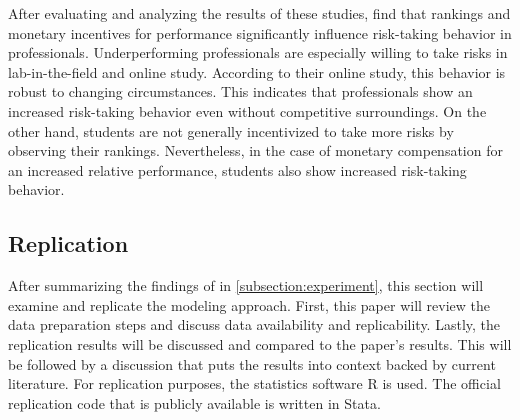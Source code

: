 \documentclass[12pt]{article}
\begin{document}
\par
After evaluating and analyzing the results of these studies, \textcite{Kirchler2018} find that rankings and monetary incentives for performance significantly influence risk-taking behavior in professionals. Underperforming professionals are especially willing to take risks in lab-in-the-field and online study. According to their online study, this behavior is robust to changing circumstances. This indicates that professionals show an increased risk-taking behavior even without competitive surroundings. On the other hand, students are not generally incentivized to take more risks by observing their rankings. Nevertheless, in the case of monetary compensation for an increased relative performance, students also show increased risk-taking behavior.


\subsection{Replication} \label{subsection:replication}
After summarizing the findings of \textcite{Kirchler2018} in \autoref{subsection:experiment}, this section will examine and replicate the modeling approach. First, this paper will review the data preparation steps and discuss data availability and replicability. Lastly, the replication results will be discussed and compared to the paper's results.
This will be followed by a discussion that puts the results into context backed by current literature. For replication purposes, the statistics software R is used. The official replication code that is publicly available is written in Stata.
\end{document}
